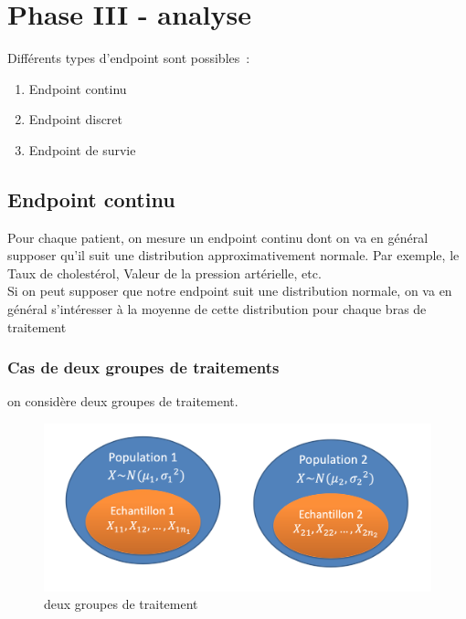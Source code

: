 \chapter{Phase III - analyse}

Différents types d'endpoint sont possibles :
\begin{enumerate}
    \item Endpoint continu
    \item Endpoint discret
    \item Endpoint de survie
\end{enumerate}

\section{Endpoint continu}
Pour chaque patient, on mesure un endpoint continu dont on va en général supposer qu’il suit une distribution approximativement normale. Par exemple, le Taux de cholestérol, Valeur de la pression artérielle, etc.\\

Si on peut supposer que notre endpoint suit une distribution normale, on va en général s’intéresser à la moyenne de cette distribution pour chaque bras de traitement

\subsection{Cas de deux groupes de traitements}

on considère deux groupes de traitement.
\begin{figure}[H]
    \centering
    \includegraphics[scale = 0.5]{images/2groupescontinu.png}
    \caption{deux groupes de traitement}
    \label{fig:my_label}
\end{figure}




